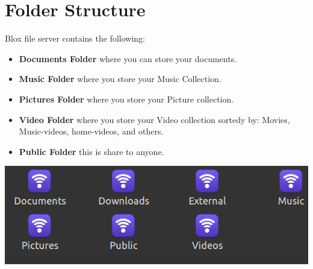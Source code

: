 \documentclass[letterpaper,10pt,english]{sphinxmanual}
\begin{document}
\section{Folder Structure}
\label{yourfiles:folder-structure}\label{yourfiles:id4}
Blox file server contains the following:
\begin{itemize}
\item {} 
\textbf{Documents Folder} where you can store your documents.

\item {} 
\textbf{Music Folder} where you store your Music Collection.

\item {} 
\textbf{Pictures Folder} where you store your Picture collection.

\item {} 
\textbf{Video Folder} where you store your Video collection sortedy by: Movies, Music-videos, home-videos, and others.

\item {} 
\textbf{Public Folder} this is share to anyone.

\end{itemize}

\includegraphics{folder-structure.png}

\begin{DUlineblock}{0em}
\item[] 
\end{DUlineblock}
\end{document}
